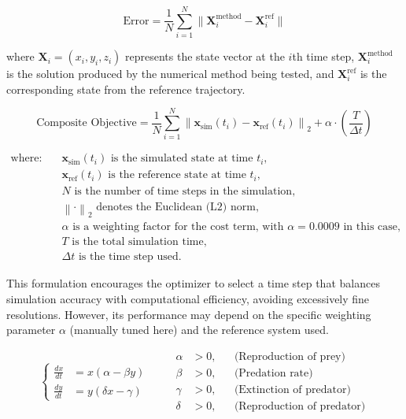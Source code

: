\begin{equation}\label{eq:error_metric}
    \text{Error} = \frac{1}{N} \sum_{i=1}^{N} 
    \bigl\| \mathbf{X}_i^{\text{method}} - \mathbf{X}_i^{\text{ref}} \bigr\|
    \end{equation}
    
    \noindent
    where \(\mathbf{X}_i = (x_i, y_i, z_i)\) represents the state vector at the \(i\)th time step, \(\mathbf{X}_i^{\text{method}}\) is the solution produced by the numerical method being tested, and \(\mathbf{X}_i^{\text{ref}}\) is the corresponding state from the reference trajectory.
    

    \begin{equation}
        \text{Composite Objective} = \frac{1}{N} \sum_{i=1}^{N} \left\| \mathbf{x}_{\text{sim}}(t_i) - \mathbf{x}_{\text{ref}}(t_i) \right\|_2 + \alpha \cdot \left( \frac{T}{\Delta t} \right)
        \label{eq:composite_objective}
        \end{equation}
        
        \begin{align*}
        \text{where:} \quad
        & \mathbf{x}_{\text{sim}}(t_i) \text{ is the simulated state at time } t_i, \\
        & \mathbf{x}_{\text{ref}}(t_i) \text{ is the reference state at time } t_i, \\
        & N \text{ is the number of time steps in the simulation}, \\
        & \left\| \cdot \right\|_2 \text{ denotes the Euclidean (L2) norm}, \\
        & \alpha \text{ is a weighting factor for the cost term, with } \alpha = 0.0009 \text{ in this case}, \\
        & T \text{ is the total simulation time}, \\
        & \Delta t \text{ is the time step used.}
        \end{align*}
        
        \noindent
        This formulation encourages the optimizer to select a time step that balances simulation accuracy with computational efficiency, avoiding excessively fine resolutions. However, its performance may depend on the specific weighting parameter $\alpha$ (manually tuned here) and the reference system used.
        

\begin{equation}\label{eq:predator_prey}
            \left\{
            \begin{aligned}
            \frac{dx}{dt} &= x(\alpha - \beta y) \\
            \frac{dy}{dt} &= y(\delta x - \gamma)
            \end{aligned}
            \right.
            \qquad
            \begin{aligned}
            \alpha &> 0, && \text{(Reproduction of prey)} \\
            \beta &> 0, && \text{(Predation rate)} \\
            \gamma &> 0, && \text{(Extinction of predator)} \\
            \delta &> 0, && \text{(Reproduction of predator)}
            \end{aligned}
\end{equation}
            